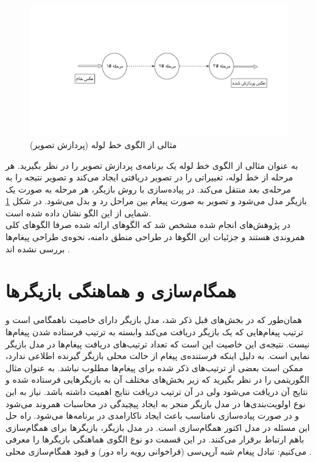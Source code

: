 \begin{figure}
    \begin{center}
	\includegraphics[width=16cm]{3-RelatedWork/Figures/pipeline.pdf}
    \end{center}
    \caption{\label{fig:pipeline}  مثالی از الگوی خط لوله (پردازش تصویر) }
\end{figure}
به عنوان مثالی از الگوی خط لوله یک برنامه‌ی پردازش تصویر را در نظر بگیرید. هر مرحله از خط لوله، تغییراتی را در تصویر دریافتی ایجاد می‌کند و تصویر نتیجه را به مرحله‌ی بعد منتقل می‌کند. در پیاده‌سازی با روش بازیگر، هر مرحله به صورت یک بازیگر مدل می‌شود و تصویر به صورت پیغام بین مراحل رد و بدل می‌شود. در شکل \ref{fig:pipeline} شمایی از این الگو نشان داده شده‌ است. \\
در پژوهش‌های انجام شده مشخص شد که الگوهای ارائه شده صرفا الگوهای کلی همروندی هستند و جزئیات این الگوها در طراحی منطق دامنه، نحوه‌ی طراحی پیغام‌ها بررسی نشده اند .

\section{ همگام‌سازی و هماهنگی بازیگرها }
\label{section:coordinationAndSyncronization}
همان‌طور که در بخش‌های قبل ذکر شد،  مدل بازیگر دارای خاصیت ناهمگامی‌ است و ترتیب پیغام‌هایی که یک بازیگر دریافت می‌کند وابسته به ترتیب فرستاده شدن پیغام‌ها نیست. نتیجه‌ی این خاصیت این است که تعداد ترتیب‌های دریافت پیغام‌ها در مدل بازیگر نمایی است\cite{KarmaniAgha_Actors_11}. به دلیل اینکه فرستنده‌ی پیغام از حالت محلی بازیگر گیرنده اطلاعی ندارد، ممکن است بعضی از ترتیب‌های ذکر شده برای پیغام‌ها مطلوب نباشد. به عنوان مثال الگوریتمی را در نظر بگیرید که زیر بخش‌های مختلف آن به بازیگر‌هایی فرستاده شده و نتایج آن دریافت می‌شود ولی در آن ترتیب دریافت نتایج اهمیت داشته باشد.  نیاز به این نوع اولویت‌بندی‌ها در مدل بازیگر منجر به ایجاد پیچیدگی در محاسبات همروند می‌شود و در صورت پیاده‌سازی نامناسب باعث ایجاد ناکارامدی در برنامه‌ها می‌شود. راه حل این مسئله در مدل اکتور همگام‌سازی است. در مدل بازیگر، بازیگر‌ها برای همگام‌سازی باهم ارتباط برقرار می‌کنند. در این قسمت دو نوع الگوی هماهنگی بازیگر‌ها را معرفی می‌کنیم: تبادل پیغام شبه آرپی‌سی (فراخوانی رویه راه دور) و قیود همگام‌سازی محلی . \cite{Agha1990,Agha93abstractionand,Papaioannou,KarmaniAgha_Actors_11} 

